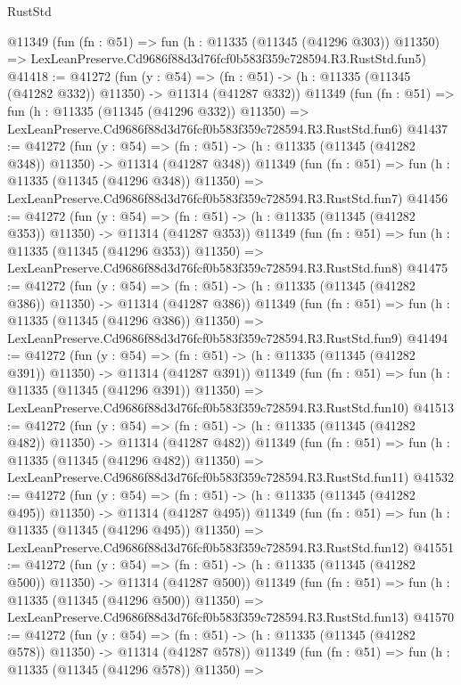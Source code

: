 \begin{lexlean}{RustStd}
\begin{coremodule}
    @11349
    (fun (fn : @51) =>
    fun (h : @11335 (@11345 (@41296 @303)) @11350) =>
    LexLeanPreserve.Cd9686f88d3d76fcf0b583f359c728594.R3.RustStd.fun5)
@41418 := @41272
    (fun (y : @54) =>
    (fn : @51) -> (h : @11335 (@11345 (@41282 @332)) @11350) -> @11314 (@41287 @332))
    @11349
    (fun (fn : @51) =>
    fun (h : @11335 (@11345 (@41296 @332)) @11350) =>
    LexLeanPreserve.Cd9686f88d3d76fcf0b583f359c728594.R3.RustStd.fun6)
@41437 := @41272
    (fun (y : @54) =>
    (fn : @51) -> (h : @11335 (@11345 (@41282 @348)) @11350) -> @11314 (@41287 @348))
    @11349
    (fun (fn : @51) =>
    fun (h : @11335 (@11345 (@41296 @348)) @11350) =>
    LexLeanPreserve.Cd9686f88d3d76fcf0b583f359c728594.R3.RustStd.fun7)
@41456 := @41272
    (fun (y : @54) =>
    (fn : @51) -> (h : @11335 (@11345 (@41282 @353)) @11350) -> @11314 (@41287 @353))
    @11349
    (fun (fn : @51) =>
    fun (h : @11335 (@11345 (@41296 @353)) @11350) =>
    LexLeanPreserve.Cd9686f88d3d76fcf0b583f359c728594.R3.RustStd.fun8)
@41475 := @41272
    (fun (y : @54) =>
    (fn : @51) -> (h : @11335 (@11345 (@41282 @386)) @11350) -> @11314 (@41287 @386))
    @11349
    (fun (fn : @51) =>
    fun (h : @11335 (@11345 (@41296 @386)) @11350) =>
    LexLeanPreserve.Cd9686f88d3d76fcf0b583f359c728594.R3.RustStd.fun9)
@41494 := @41272
    (fun (y : @54) =>
    (fn : @51) -> (h : @11335 (@11345 (@41282 @391)) @11350) -> @11314 (@41287 @391))
    @11349
    (fun (fn : @51) =>
    fun (h : @11335 (@11345 (@41296 @391)) @11350) =>
    LexLeanPreserve.Cd9686f88d3d76fcf0b583f359c728594.R3.RustStd.fun10)
@41513 := @41272
    (fun (y : @54) =>
    (fn : @51) -> (h : @11335 (@11345 (@41282 @482)) @11350) -> @11314 (@41287 @482))
    @11349
    (fun (fn : @51) =>
    fun (h : @11335 (@11345 (@41296 @482)) @11350) =>
    LexLeanPreserve.Cd9686f88d3d76fcf0b583f359c728594.R3.RustStd.fun11)
@41532 := @41272
    (fun (y : @54) =>
    (fn : @51) -> (h : @11335 (@11345 (@41282 @495)) @11350) -> @11314 (@41287 @495))
    @11349
    (fun (fn : @51) =>
    fun (h : @11335 (@11345 (@41296 @495)) @11350) =>
    LexLeanPreserve.Cd9686f88d3d76fcf0b583f359c728594.R3.RustStd.fun12)
@41551 := @41272
    (fun (y : @54) =>
    (fn : @51) -> (h : @11335 (@11345 (@41282 @500)) @11350) -> @11314 (@41287 @500))
    @11349
    (fun (fn : @51) =>
    fun (h : @11335 (@11345 (@41296 @500)) @11350) =>
    LexLeanPreserve.Cd9686f88d3d76fcf0b583f359c728594.R3.RustStd.fun13)
@41570 := @41272
    (fun (y : @54) =>
    (fn : @51) -> (h : @11335 (@11345 (@41282 @578)) @11350) -> @11314 (@41287 @578))
    @11349
    (fun (fn : @51) =>
    fun (h : @11335 (@11345 (@41296 @578)) @11350) =>

\end{coremodule}
\end{lexlean}
